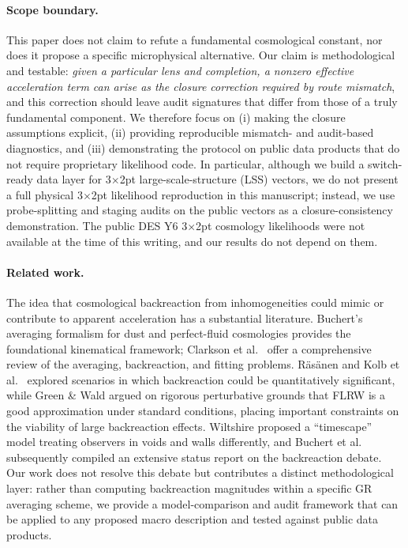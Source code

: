 \documentclass[11pt]{article}
\theoremstyle{definition}
\theoremstyle{plain}
\theoremstyle{remark}
\begin{document}
\paragraph{Scope boundary.}
This paper does not claim to refute a fundamental cosmological constant, nor does it propose a specific microphysical alternative. Our claim is methodological and testable: \emph{given a particular lens and completion, a nonzero effective acceleration term can arise as the closure correction required by route mismatch}, and this correction should leave audit signatures that differ from those of a truly fundamental component. We therefore focus on (i) making the closure assumptions explicit, (ii) providing reproducible mismatch- and audit-based diagnostics, and (iii) demonstrating the protocol on public data products that do not require proprietary likelihood code. In particular, although we build a switch-ready data layer for 3$\times$2pt large-scale-structure (LSS) vectors, we do not present a full physical 3$\times$2pt likelihood reproduction in this manuscript; instead, we use probe-splitting and staging audits on the public vectors as a closure-consistency demonstration. The public DES Y6 3$\times$2pt cosmology likelihoods were not available at the time of this writing, and our results do not depend on them.

\paragraph{Related work.}
The idea that cosmological backreaction from inhomogeneities could mimic or contribute to apparent acceleration has a substantial literature.
Buchert's averaging formalism for dust and perfect-fluid cosmologies \cite{Buchert2000Dust,Buchert2001PerfectFluid} provides the foundational kinematical framework; Clarkson et al.\ \cite{Clarkson2011Averaging} offer a comprehensive review of the averaging, backreaction, and fitting problems.
R\"as\"anen \cite{Rasanen2004Backreaction} and Kolb et al.\ \cite{Kolb2006Acceleration} explored scenarios in which backreaction could be quantitatively significant, while Green \& Wald \cite{GreenWald2014FLRW} argued on rigorous perturbative grounds that FLRW is a good approximation under standard conditions, placing important constraints on the viability of large backreaction effects.
Wiltshire \cite{Wiltshire2007Cosmic} proposed a ``timescape'' model treating observers in voids and walls differently, and Buchert et al.\ \cite{Buchert2015Backreaction} subsequently compiled an extensive status report on the backreaction debate.
Our work does not resolve this debate but contributes a distinct methodological layer: rather than computing backreaction magnitudes within a specific GR averaging scheme, we provide a model-comparison and audit framework that can be applied to any proposed macro description and tested against public data products.
\end{document}

